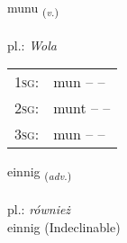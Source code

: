 \documentclass[frontgrid, backgrid]{flacards}\usepackage[]{graphicx}\usepackage[]{xcolor}
\begin{document}
{munu \small{\textsubscript{(\textit{v.})}} \\[1ex] %
\textphonetic{[mʏːnʏ]} \\
pl.: \emph{Wola} \\  [2ex]
\renewcommand*{\arraystretch}{0.8}
\begin{tabular}{p{1cm}l}
\textsc{1sg}: & mun --  --  \\ 
\textsc{2sg}: & munt --  --  \\ 
\textsc{3sg}: & mun --  --  \\ 
\end{tabular}
}


\renewcommand{\flhead}{\vskip5pt \fboxsep=0pt {\small\bfseries\footnotesize Atviksorð | przysłówek}}
\renewcommand{\fcfoot}{\vskip5pt \fboxsep=0pt \hspace{2pt}{\small\bfseries\footnotesize 1K}}

\renewcommand{\blhead}{\vskip5pt {\small\bfseries\footnotesize Atviksorð | przysłówek }}
\renewcommand{\bcfoot}{\vskip5pt \hspace{2pt}{\small\bfseries\footnotesize 1K}}


{einnig \small{\textsubscript{(\textit{adv.})}} \\[1ex]
\textphonetic{[eitnɪɣ]} \\
pl.: \emph{również} \\  [2ex]
einnig (Indeclinable)}

\renewcommand{\flhead}{\vskip5pt \fboxsep=0pt {\small\bfseries\footnotesize Nafnorð | rzeczownik}}
\renewcommand{\fcfoot}{\vskip5pt \fboxsep=0pt \hspace{2pt}{\small\bfseries\footnotesize 1K}}

\renewcommand{\blhead}{\vskip5pt {\small\bfseries\footnotesize Nafnorð | rzeczownik }}
\renewcommand{\bcfoot}{\vskip5pt \hspace{2pt}{\small\bfseries\footnotesize 1K}}
\end{document}
